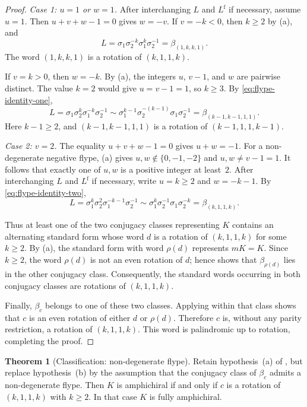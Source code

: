 \documentclass[11pt]{article}
\theoremstyle{definition}
\newtheorem{theorem}{Theorem}[section]
\begin{document}
\begin{proof}
\smallskip
\noindent\emph{Case 1: $u=1$ or $w=1$.}
After interchanging $L$ and $L^{\mathrm f}$ if necessary, assume $u=1$.
Then $u+v+w-1=0$ gives $w=-v$. If $v=-k<0$, then
$k\ge2$ by (a), and
\[
L=\sigma_1\sigma_2^{-k}\sigma_1^k\sigma_2^{-1}
=\beta_{(1,k,k,1)}.
\]
The word $(1,k,k,1)$ is a rotation of $(k,1,1,k)$.

If $v=k>0$, then $w=-k$. By (a), the integers
$u$, $v-1$, and $w$ are pairwise distinct. The value $k=2$ would give
$u=v-1=1$, so $k\ge3$. By \eqref{eq:flype-identity-one},
\[
L=\sigma_1\sigma_2^k\sigma_1^{-k}\sigma_2^{-1}
\sim\sigma_1^{k-1}\sigma_2^{-(k-1)}\sigma_1\sigma_2^{-1}
=\beta_{(k-1,k-1,1,1)}.
\]
Here $k-1\ge2$, and $(k-1,k-1,1,1)$ is a rotation of
$(k-1,1,1,k-1)$.

\smallskip
\noindent\emph{Case 2: $v=2$.}
The equality $u+v+w-1=0$ gives $u+w=-1$. For a non-degenerate negative
flype, (a) gives $u,w\notin\{0,-1,-2\}$ and
$u,w\ne v-1=1$.
It follows that exactly one of $u,w$ is a positive integer at least~$2$.
After interchanging $L$ and $L^{\mathrm f}$ if necessary, write $u=k\ge2$
and $w=-k-1$. By \eqref{eq:flype-identity-two},
\[
L=\sigma_1^k\sigma_2^2\sigma_1^{-k-1}\sigma_2^{-1}
\sim\sigma_1^k\sigma_2^{-1}\sigma_1\sigma_2^{-k}
=\beta_{(k,1,1,k)}.
\]

Thus at least one of the two conjugacy classes representing $K$ contains
an alternating standard form whose word $d$ is a rotation of
$(k,1,1,k)$ for some $k\ge2$. By (a), the standard
form with word $\rho(d)$ represents $mK=K$. Since $k\ge2$, the word
$\rho(d)$ is not an even rotation of $d$; hence
 shows that $\beta_{\rho(d)}$ lies in the
other conjugacy class. Consequently, the standard words occurring in
both conjugacy classes are rotations of $(k,1,1,k)$.

Finally, $\beta_c$ belongs to one of these two classes. Applying
 within that class shows that $c$ is an even
rotation of either $d$ or $\rho(d)$. Therefore $c$ is, without any parity
restriction, a rotation of $(k,1,1,k)$. This word is palindromic up to
rotation, completing the proof.
\end{proof}

\begin{theorem}[Classification: non-degenerate flype]
\label{thm:flype-amphi}
Retain hypothesis~\textup{(a)} of , but replace
hypothesis~\textup{(b)} by the assumption that the conjugacy class of
$\beta_c$ admits a non-degenerate flype. Then $K$ is amphichiral if and
only if $c$ is a rotation of $(k,1,1,k)$ with $k\ge2$. In that case $K$
is fully amphichiral.
\end{theorem}
\end{document}
